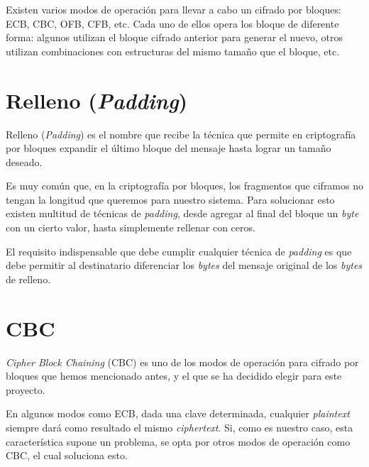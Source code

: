 Existen varios modos de operación para llevar a cabo un cifrado por bloques: ECB, CBC, OFB, CFB, etc. Cada uno de ellos opera los bloque de diferente forma: algunos utilizan el bloque cifrado anterior para generar el nuevo, otros utilizan combinaciones con estructuras del mismo tamaño que el bloque, etc. \emph{\parencite{Reference21}}


\section{Relleno (\emph{Padding})}

Relleno (\emph{Padding}) es el nombre que recibe la técnica que permite en criptografía por bloques expandir el último bloque del mensaje hasta lograr un tamaño deseado.

Es muy común que, en la criptografía por bloques, los fragmentos que ciframos no tengan la longitud que queremos para nuestro sistema. Para solucionar esto existen multitud de técnicas de \emph{padding}, desde agregar al final del bloque un \emph{byte} con un cierto valor, hasta simplemente rellenar con ceros.

El requisito indispensable que debe cumplir cualquier técnica de \emph{padding} es que debe permitir al destinatario diferenciar los \emph{bytes} del mensaje original de los \emph{bytes} de relleno. \emph{\parencite{Reference8}}


\section{CBC}

\emph{Cipher Block Chaining} (CBC) es uno de los modos de operación para cifrado por bloques que hemos mencionado antes, y el que se ha decidido elegir para este proyecto.

En algunos modos como ECB, dada una clave determinada, cualquier \emph{plaintext} siempre dará como resultado el mismo \emph{ciphertext}. Si, como es nuestro caso, esta característica supone un problema, se opta por otros modos de operación como CBC, el cual soluciona esto. \emph{\parencite{Reference23}}

